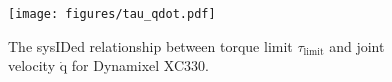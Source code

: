 \begin{figure}
  \centering
  \texttt{[image: figures/tau\_qdot.pdf]}
  \caption{The sysIDed relationship between torque limit ${\tau}_{\text{limit}}$ and joint velocity ${\dot{\mathrm{q}}}$ for Dynamixel XC330.}
  \label{fig:tau_qdot}
  \vspace{-3mm}
\end{figure}